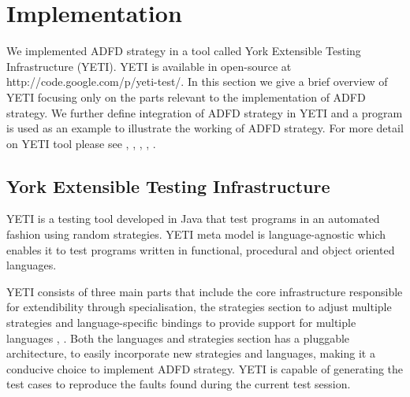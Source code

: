 \documentclass[runningheads,a4paper]{llncs}
\begin{document}












\section{Implementation}\label{sec:implementation}
 We implemented ADFD strategy in a tool called York Extensible Testing Infrastructure (YETI). YETI is available in open-source at http://code.google.com/p/yeti-test/. In this section we give a brief overview of YETI focusing only on the parts relevant to the implementation of ADFD strategy. We further define integration of ADFD strategy in YETI and a program is used as an example to illustrate the working of ADFD strategy. For more detail on YETI tool please see \cite{Oriol2010},  \cite{Oriol2010a},  \cite{Oriol2010b},  \cite{Oriol2011},  \cite{Oriol2012}.

 \subsection{York Extensible Testing Infrastructure}
YETI is a testing tool developed in Java that test programs in an automated fashion using random strategies. YETI meta model is language-agnostic which enables it to test programs written in functional, procedural and object oriented languages.

YETI consists of three main parts that include the core infrastructure responsible for extendibility through specialisation, the strategies section to adjust multiple strategies and language-specific bindings to provide support for multiple languages \cite{Oriol2010},  \cite{Oriol2010b}. Both the languages and strategies section has a pluggable architecture, to easily incorporate new strategies and languages, making it a conducive choice to implement ADFD strategy. YETI is capable of generating the test cases to reproduce the faults found during the current test session.
 
\end{document}
